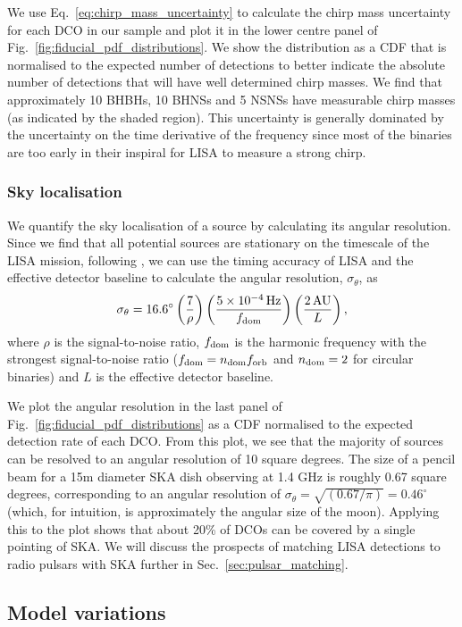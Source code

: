 We use Eq.~\ref{eq:chirp_mass_uncertainty} to calculate the chirp mass uncertainty for each DCO in our sample and plot it in the lower centre panel of Fig.~\ref{fig:fiducial_pdf_distributions}. We show the distribution as a CDF that is normalised to the expected number of detections to better indicate the absolute number of detections that will have well determined chirp masses. We find that approximately 10 BHBHs, 10 BHNSs and 5 NSNSs have measurable chirp masses (as indicated by the shaded region). This uncertainty is generally dominated by the uncertainty on the time derivative of the frequency since most of the binaries are too early in their inspiral for LISA to measure a strong chirp.

\subsubsection{Sky localisation}
We quantify the sky localisation of a source by calculating its angular resolution. Since we find that all potential sources are stationary on the timescale of the LISA mission, following \citet{Mandel+2018}, we can use the timing accuracy of LISA and the effective detector baseline to calculate the angular resolution, $\sigma_{\theta}$, as
\begin{equation}
    \sigma_{\theta} = 16.6^\circ \left(\frac{7}{\rho}\right) \left(\frac{5 \times 10^{-4} \unit{Hz}}{f_{\rm dom}}\right) \left( \frac{2 \unit{AU}}{L} \right),
\end{equation}
where $\rho$ is the signal-to-noise ratio, $f_{\rm dom}$ is the harmonic frequency with the strongest signal-to-noise ratio ($f_{\rm dom} = n_{\rm dom} f_{\rm orb}$ and $n_{\rm dom} = 2$ for circular binaries) and $L$ is the effective detector baseline.

We plot the angular resolution in the last panel of Fig.~\ref{fig:fiducial_pdf_distributions} as a CDF normalised to the expected detection rate of each DCO. From this plot, we see that the majority of sources can be resolved to an angular resolution of 10 square degrees. The size of a pencil beam for a 15m diameter SKA dish observing at 1.4 GHz is roughly 0.67 square degrees, corresponding to an angular resolution of $\sigma_\theta = \sqrt{(0.67 / \pi)} = 0.46^\circ$ (which, for intuition, is approximately the angular size of the moon). Applying this to the plot shows that about 20\% of DCOs can be covered by a single pointing of SKA. We will discuss the prospects of matching LISA detections to radio pulsars with SKA further in Sec.~\ref{sec:pulsar_matching}.

\subsection{Model variations}
